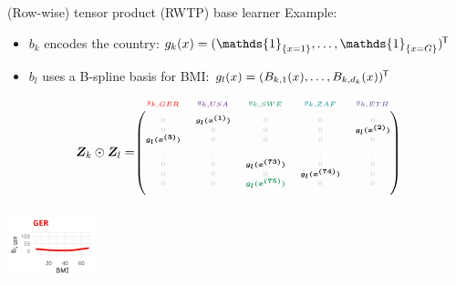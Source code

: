 \documentclass[t,10pt]{beamer}
\begin{document}
\begin{frame}{(Row-wise) tensor product (RWTP) base learner}
  Example:
  \begin{itemize}
    \item $b_k$ encodes the country: $g_k(x) = (\mathds{1}_{\{x = 1\}}, \dots, \mathds{1}_{\{x = G\}})^\tran$
    \item $b_l$ uses a B-spline basis for BMI: $g_l(x) = (B_{k,1}(x), \dots, B_{k,d_k}(x))^{\mkern-1.5mu\mathsf{T}}$
  \end{itemize}
  $$
    \design_k \odot \design_l = \tiny\begin{blockarray}{ccccc}
      \color[HTML]{EE0000}g_{k,GER} & \color[HTML]{631879}g_{k,USA} & \color[HTML]{008B45}g_{k,SWE} & \color[HTML]{008280}g_{k,ZAF} & \color[HTML]{3B4992}g_{k,ETH}\\
    \begin{block}{(ccccc)}
      \phantom{x}\\
      \color{lightgray}0 & \color{black}\bm{g_l(x^{(1)})} & \color{lightgray}0 & \color{lightgray}0 & \color{lightgray}0 \\
      \color{lightgray}0 & \color{lightgray}0 & \color{lightgray}0 & \color{lightgray}0 & \color{black}\bm{g_l(x^{(2)})} \\
      \color{black}\bm{g_l(x^{(3)})} & \color{lightgray}0 & \color{lightgray}0 & \color{lightgray}0 & \color{lightgray}0 \\
      \color{lightgray}\vdots & \color{lightgray}\vdots & \color{lightgray}\vdots & \color{lightgray}\vdots & \color{lightgray}\vdots \\
      \color{lightgray}0 & \color{lightgray}0 & \color{black}\bm{g_l(x^{(73)})} & \color{lightgray}0 & \color{lightgray}0 \\
      \color{lightgray}0 & \color{lightgray}0 & \color{lightgray}0 & \color{black}\bm{g_l(x^{(74)})} & \color{lightgray}0 \\
      \color{lightgray}0 & \color{lightgray}0 & \color[HTML]{008B45}\bm{g_l(x^{(75)})} & \color{lightgray}0 & \color{lightgray}0 \\
      \phantom{x}\\
    \end{block}
  \end{blockarray}
  $$
  \normalsize
  {\includegraphics[width=0.19\textwidth]{figures/bs-tensor/fig-tensor-GER.png}}

\end{frame}
\end{document}
